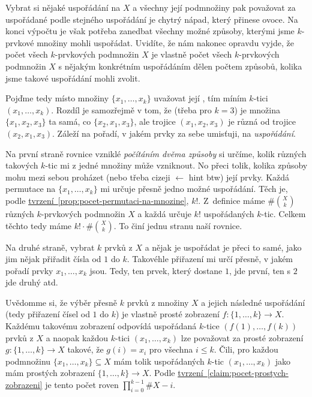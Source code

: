 Vybrat si nějaké uspořádání na $X$ a všechny její podmnožiny pak považovat za
uspořádané podle stejného uspořádání je chytrý nápad, který přinese ovoce. Na
konci výpočtu je však potřeba zanedbat všechny možné způsoby, kterými jsme 
$k$-prvkové množiny mohli uspořádat. Uvidíte, že nám nakonec opravdu vyjde, že
počet všech $k$-prvkových podmnožin $X$ je vlastně počet všech $k$-prvkových
podmnožin $X$ s nějakým konkrétním uspořádáním dělen počtem způsobů, kolika jsme
takové uspořádání mohli zvolit.

Pojďme tedy místo množiny $\{x_1,\ldots,x_k\}$ uvažovat její , tím míním $k$-tici $(x_1,\ldots,x_k)$. Rozdíl je samozřejmě v tom, že
(třeba pro $k = 3$) je množina $\{x_1,x_2,x_3\}$ ta samá, co $\{x_2,x_1,x_3\}$,
ale trojice $(x_1,x_2,x_3)$ je různá od trojice $(x_2,x_1,x_3)$. Záleží na
pořadí, v jakém prvky za sebe umisťuji, na \emph{uspořádání}.

Na první straně rovnice vzniklé \emph{počítáním dvěma způsoby} si určíme, kolik
různých takových $k$-tic mi z jedné množiny může vzniknout. No přeci tolik,
kolika způsoby mohu mezi sebou proházet (nebo třeba cizeji 
$\leftarrow$ hint btw) její prvky. Každá permutace na $\{x_1,\ldots,x_k\}$ mi
určuje přesně jedno možné uspořádání. Těch je, podle
\hyperref[prop:pocet-permutaci-na-mnozine]{tvrzení~\ref*{prop:pocet-permutaci-na-mnozine}},
$k!$. Z~definice máme $\# \binom{X}{k}$ různých $k$-prvkových podmnožin $X$ a
každá určuje $k!$ uspořádaných $k$-tic. Celkem těchto tedy máme $k! \cdot \#
\binom{X}{k}$. To činí jednu stranu naší rovnice.

Na druhé straně, vybrat $k$ prvků z $X$ a nějak je uspořádat je přeci to samé,
jako jim nějak přiřadit čísla od $1$ do $k$. Takovéhle přiřazení mi určí přesně,
v jakém pořadí prvky $x_1,\ldots,x_k$ jsou. Tedy, ten prvek, který dostane $1$,
jde první, ten s $2$ jde druhý atd.

Uvědomme si, že výběr přesně $k$ prvků z množiny $X$ a jejich následné
uspořádání (tedy přiřazení čísel od $1$ do $k$) je vlastně prosté zobrazení ${f:
\{1,\ldots,k\} \to X}$. Každému takovému zobrazení odpovídá uspořádaná $k$-tice
$(f(1),\ldots,f(k))$ prvků z $X$ a naopak každou $k$-tici $(x_1,\ldots,x_k)$
lze považovat za prosté zobrazení $g: \{1,\ldots,k\} \to X$ takové, že
$g(i)=x_i$ pro všechna $i \leq k$. Čili, pro každou podmnožinu
$\{x_1,\ldots,x_k\} \subseteq X$ mám tolik uspořádaných $k$-tic
$(x_1,\ldots,x_k)$ jako mám prostých zobrazení $\{1,\ldots,k\} \to X$. Podle
\hyperref[claim:pocet-prostych-zobrazeni]{tvrzení~\ref*{claim:pocet-prostych-zobrazeni}}
je tento počet roven $\prod_{i=0}^{k-1} \#X-i$.

